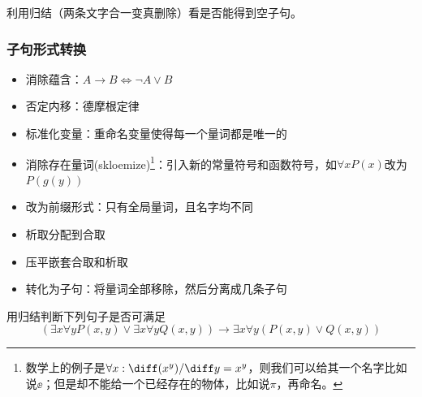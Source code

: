 利用归结（两条文字合一变真删除）看是否能得到空子句。

\subsubsection{子句形式转换}
\begin{itemize}
	\item 消除蕴含：$A\to B\iff \lnot A\lor B$
	\item 否定内移：德摩根定律
	\item 标准化变量：重命名变量使得每一个量词都是唯一的
	\item 消除存在量词(skloemize)\footnote{数学上的例子是$\forall x:\diff (x^y)/\diff y=x^y$，则我们可以给其一个名字比如说$\ee$；但是却不能给一个已经存在的物体，比如说$\pi$，再命名。}：引入新的常量符号和函数符号，如$\forall x P(x)$改为$P(g(y))$
	\item 改为前缀形式：只有全局量词，且名字均不同
	\item 析取分配到合取
	\item 压平嵌套合取和析取
	\item 转化为子句：将量词全部移除，然后分离成几条子句
\end{itemize}
\begin{example} %
用归结判断下列句子是否可满足
\[(\exists x\forall y P(x,y)\lor\exists x\forall y Q(x,y))\to
\exists x\forall y(P(x,y)\lor Q(x,y))\]
\end{example}
